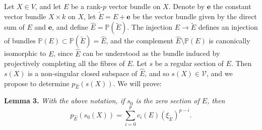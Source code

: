 \documentclass{article}
\newenvironment{itenv}[1]
  {\phantomsection\par\medskip\noindent\textbf{#1.}\itshape}
  {\par\medskip}
\renewcommand{\cal}[1]{{\mathcal{#1}}}
\newcommand{\oldpage}[1]{\marginpar{\footnotesize$\Big\vert$ \textit{p.~#1}}}
\begin{document}
\oldpage{152}
Let $X\in V$, and let $E$ be a rank-$p$ vector bundle on $X$.
Denote by $\mathbf{e}$ the constant vector bundle $X\times k$ on $X$, let $\widetilde{E}=E+\mathbf{e}$ be the vector bundle given by the direct sum of $E$ and $\mathbf{e}$, and define $\widehat{E}=\mathbb{P}(\widetilde{E})$.
The injection $E\to\widetilde{E}$ defines an injection of bundles $\mathbb{P}(E)\subset\mathbb{P}(\widetilde{E})=\widehat{E}$, and the complement $\widehat{E}\setminus\mathbb{P}(E)$ is canonically isomorphic to $E$, since $\widehat{E}$ can be understood as the bundle induced by projectively completing all the fibres of $E$.
Let $s$ be a regular section of $E$.
Then $s(X)$ is a non-singular closed subspace of $\widehat{E}$, and so $s(X)\in\cal{V}$, and we propose to determine $p_{\widehat{E}}(s(X))$.
We will prove:

\begin{itenv}{Lemma 3}
\label{lemma3}
  With the above notation, if $s_0$ is the zero section of $E$, then
  \[
  \label{equation17}
    p_{\widehat{E}}(s_0(X)) = \sum_{i=0}^p c_i(E)(\xi_{\widetilde{E}})^{p-i}.
  \tag{17}
  \]
\end{itenv}
\end{document}

